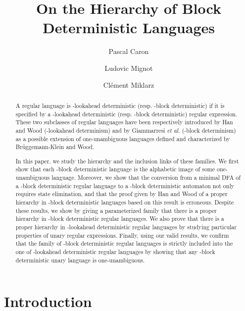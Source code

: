 \documentclass{llncs}
\begin{document}
\title{On the Hierarchy of Block Deterministic Languages}
  
\author{Pascal Caron \and Ludovic Mignot \and Clément Miklarz} 

  
\maketitle

  \begin{abstract}
    A regular language is -lookahead deterministic (resp. -block deterministic) if it is specified by a -lookahead deterministic (resp. -block deterministic) regular expression.
	These two subclasses of regular languages have been respectively introduced by Han and Wood (-lookahead determinism) and by Giammarresi \emph{et al.} (-block determinism) as a possible extension of one-unambiguous languages defined and characterized by Brüggemann-Klein and Wood.

	In this paper, we study the hierarchy and the inclusion links of these families.
	We first show that each -block deterministic language is the alphabetic image of some one-unambiguous language. 
	Moreover, we show that the conversion from a minimal DFA of a -block deterministic regular language to a -block deterministic automaton not only requires state elimination, and that the proof given by Han and Wood of a proper hierarchy in -block deterministic languages based on this result is erroneous.
	Despite these results, we show by giving a parameterized family that there is a proper hierarchy in -block deterministic regular languages. 
	We also prove that there is a proper hierarchy in -lookahead deterministic regular languages by studying particular properties of unary regular expressions.
	Finally, using our valid results, we confirm that the family of -block deterministic regular languages is strictly included into the one of -lookahead deterministic regular languages by showing that any -block deterministic unary language is one-unambiguous.
  \end{abstract} 

\section{Introduction}\label{se:int}
\end{document}
